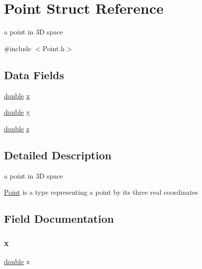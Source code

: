 \hypertarget{struct_point}{}\section{Point Struct Reference}
\label{struct_point}


a point in 3D space  




{\ttfamily \#include $<$Point.\+h$>$}

\subsection*{Data Fields}
\begin{DoxyCompactItemize}
\item 
\hyperlink{g3x__transfo_8h_a89b2b23e407882a535d835574a7912e1}{double} \hyperlink{struct_point_af88b946fb90d5f08b5fb740c70e98c10}{x}
\item 
\hyperlink{g3x__transfo_8h_a89b2b23e407882a535d835574a7912e1}{double} \hyperlink{struct_point_ab927965981178aa1fba979a37168db2a}{y}
\item 
\hyperlink{g3x__transfo_8h_a89b2b23e407882a535d835574a7912e1}{double} \hyperlink{struct_point_ab3e6ed577a7c669c19de1f9c1b46c872}{z}
\end{DoxyCompactItemize}


\subsection{Detailed Description}
a point in 3D space 

\hyperlink{struct_point}{Point} is a type representing a point by its three real coordinates 

\subsection{Field Documentation}
\mbox{\label{struct_point_af88b946fb90d5f08b5fb740c70e98c10}} 
\subsubsection{\texorpdfstring{x}{x}}
{\footnotesize\ttfamily \hyperlink{g3x__transfo_8h_a89b2b23e407882a535d835574a7912e1}{double} x}

\mbox{\label{struct_point_ab927965981178aa1fba979a37168db2a}} 
